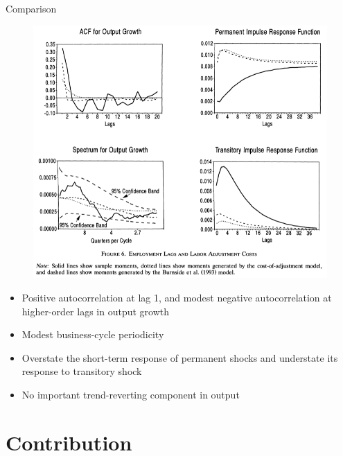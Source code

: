 \documentclass[10pt]{beamer}
\begin{document}
\begin{frame}{Comparison}
    \begin{figure}
        \centering
        \includegraphics[width=0.57\linewidth]{figures/Labor_cost.png}
    \end{figure}
    {\footnotesize
    \begin{itemize}
        \item Positive autocorrelation at lag 1, and modest negative autocorrelation at
              higher-order lags in output growth
        \item Modest business-cycle periodicity
        \item Overstate the short-term response of permanent shocks and understate its
              response to transitory shock
        \item No important trend-reverting component in output
    \end{itemize}}
\end{frame}

\section{Contribution}
\end{document}
